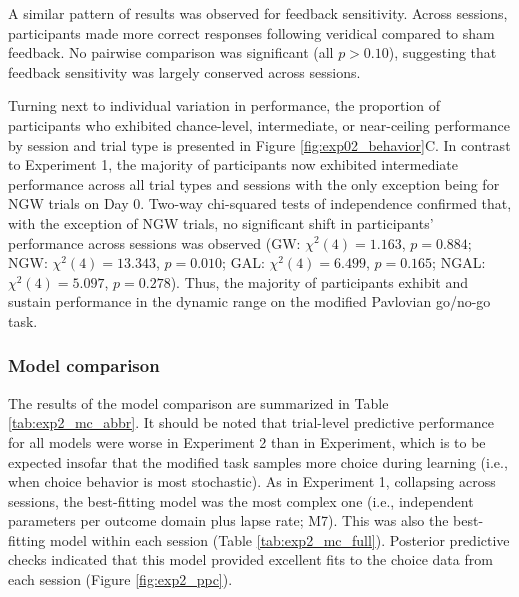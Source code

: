 \documentclass[a4paper,12pt]{article}
\begin{document}
\begin{refsection}[main]
A similar pattern of results was observed for feedback sensitivity. Across sessions, participants made more correct responses following veridical compared to sham feedback. No pairwise comparison was significant (all $p > 0.10$), suggesting that feedback sensitivity was largely conserved across sessions.

Turning next to individual variation in performance, the proportion of participants who exhibited chance-level, intermediate, or near-ceiling performance by session and trial type is presented in Figure \ref{fig:exp02_behavior}C. In contrast to Experiment 1, the majority of participants now exhibited intermediate performance across all trial types and sessions with the only exception being for NGW trials on Day 0. Two-way chi-squared tests of independence confirmed that, with the exception of NGW trials, no significant shift in participants' performance across sessions was observed (GW: $\chi^2 (4) = 1.163$, $p = 0.884$; NGW: $\chi^2 (4) = 13.343$, $p = 0.010$; GAL: $\chi^2 (4) = 6.499$, $p = 0.165$; NGAL: $\chi^2 (4) = 5.097$, $p = 0.278$). Thus, the majority of participants exhibit and sustain performance in the dynamic range on the modified Pavlovian go/no-go task.

\subsubsection*{Model comparison}

The results of the model comparison are summarized in Table \ref{tab:exp2_mc_abbr}. It should be noted that trial-level predictive performance for all models were worse in Experiment 2 than in Experiment, which is to be expected insofar that the modified task samples more choice during learning (i.e., when choice behavior is most stochastic). As in Experiment 1, collapsing across sessions, the best-fitting model was the most complex one (i.e., independent parameters per outcome domain plus lapse rate; M7). This was also the best-fitting model within each session (Table \ref{tab:exp2_mc_full}). Posterior predictive checks indicated that this model provided excellent fits to the choice data from each session (Figure \ref{fig:exp2_ppc}). 


\end{refsection}
\end{document}
